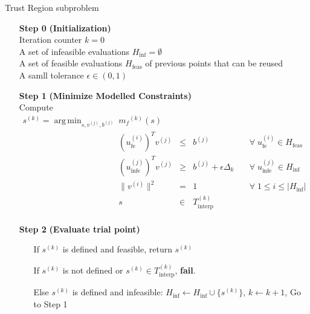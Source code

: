 \documentclass{article}
\theoremstyle{case}
\newcommand{\modelk}{{{m}_f}^{(k)}}
\newcommand{\sampletrk}{{T_{\text{interp}}^{(k)}}}
\DeclareMathOperator*{\argmin}{arg\,min}
\begin{document}
\begin{algorithm}[H]
    \caption{Trust Region subproblem}
    \label{constrained_dfo}
    \begin{itemize}
        \item[\textbf{Step 0}] \textbf{(Initialization)} \\
			Iteration counter $k = 0$ \\
            A set of infeasible evaluations $H_{\text{inf}} = \emptyset$ \\
            A set of feasible evaluations $H_{\text{feas}}$ of previous points that can be reused \\
			A samll tolerance $\epsilon \in (0, 1)$
            
        \item[\textbf{Step 1}] \textbf{(Minimize Modelled Constraints)} \\
            Compute
\begin{displaymath}
\begin{array}{cccccc}
s^{(k)} = \argmin_{s, v^{(j)}, b^{(j)}}	& \modelk(s) 	                         &       &                            				& 	\\
							& \left(u_{\text{fe}}^{(i)}\right)^T v^{(j)}     & \le   & b^{(j)}                     		& \quad \forall \; u_{\text{fe}}^{(i)} \in H_{\text{feas}}	\\
							& \left(u_{\text{infe}}^{(j)}\right)^T v^{(j)}      & \ge   & b^{(j)} + \epsilon \Delta_k   & \quad \forall \; u_{\text{infe}}^{(j)} \in H_{\text{inf}}  \\
							& \|v^{(i)}\|^2   & =     & 1                           									& \quad \forall \; 1 \le i \le |  H_{\text{inf}} | \\
							& s          & \in   & \sampletrk    														&	\\
\end{array}
\end{displaymath}
           
        \item[\textbf{Step 2}] \textbf{(Evaluate trial point)} \\
			\begin{itemize}
				\item[] If $s^{(k)}$ is defined and feasible, return $s^{(k)}$
				\item[] If $ s^{(k)} $ is not defined or $ s^{(k)} \in \sampletrk$, \textbf{fail}.
				\item[] Else $ s^{(k)} $ is defined and infeasible:
					$H_{\text{inf}} \gets H_{\text{inf}} \cup \{ s^{(k)} \} $, $k \gets k + 1$, Go to Step 1
			\end{itemize}
    \end{itemize}
\end{algorithm}
\end{document}
